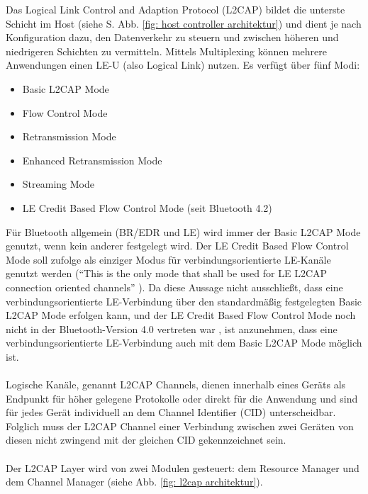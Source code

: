 Das Logical Link Control and Adaption Protocol (L2CAP) bildet die unterste Schicht im Host (siehe S. \pageref{fig: host controller architektur} Abb. \ref{fig: host controller architektur}) und dient je nach Konfiguration dazu, den Datenverkehr zu steuern und zwischen höheren und niedrigeren Schichten zu vermitteln. Mittels Multiplexing können mehrere Anwendungen einen LE-U (also Logical Link) nutzen.
Es verfügt über fünf Modi:
\begin{itemize}
    \item Basic L2CAP Mode
    \item Flow Control Mode
    \item Retransmission Mode
    \item Enhanced Retransmission Mode
    \item Streaming Mode
    \item LE Credit Based Flow Control Mode (seit Bluetooth 4.2)
\end{itemize}
Für Bluetooth allgemein (BR/EDR und LE) wird immer der Basic L2CAP Mode genutzt, wenn kein anderer festgelegt wird. Der LE Credit Based Flow Control Mode soll \cite{BtSpec4.2_1735} zufolge als einziger Modus für verbindungsorientierte LE-Kanäle genutzt werden ("`This is the only mode that shall be used for LE L2CAP connection oriented channels"' \cite{BtSpec4.2_1735}). Da diese Aussage nicht ausschließt, dass eine verbindungsorientierte LE-Verbindung über den standardmäßig festgelegten Basic L2CAP Mode erfolgen kann, und der LE Credit Based Flow Control Mode noch nicht in der Bluetooth-Version 4.0 vertreten war \cite{BtSpec4.0_1401}, ist anzunehmen, dass eine verbindungsorientierte LE-Verbindung auch mit dem Basic L2CAP Mode möglich ist.
\\\\
Logische Kanäle, genannt L2CAP Channels, dienen innerhalb eines Geräts als Endpunkt für höher gelegene Protokolle oder direkt für die Anwendung und sind für jedes Gerät individuell an dem Channel Identifier (CID) unterscheidbar. Folglich muss der L2CAP Channel einer Verbindung zwischen zwei Geräten von diesen nicht zwingend mit der gleichen CID gekennzeichnet sein.
\\\\
Der L2CAP Layer wird von zwei Modulen gesteuert: dem Resource Manager und dem Channel Manager (siehe Abb. \ref{fig: l2cap architektur}).

